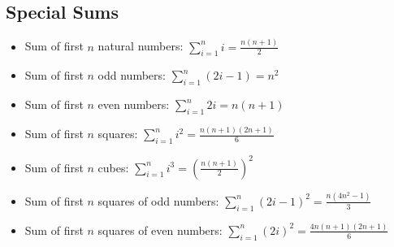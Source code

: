 \subsection{Special Sums}

\begin{itemize}
    \item Sum of first $n$ natural numbers: $\sum_{i=1}^{n} i = \frac{n(n+1)}{2}$
    \item Sum of first $n$ odd numbers: $\sum_{i=1}^{n} (2i-1) = n^2$
    \item Sum of first $n$ even numbers: $\sum_{i=1}^{n} 2i = n(n+1)$
    \item Sum of first $n$ squares: $\sum_{i=1}^{n} i^2 = \frac{n(n+1)(2n+1)}{6}$
    \item Sum of first $n$ cubes: $\sum_{i=1}^{n} i^3 = \left( \frac{n(n+1)}{2} \right)^2$
    \item Sum of first $n$ squares of odd numbers: $\sum_{i=1}^{n} (2i-1)^2 = \frac{n(4n^2 - 1)}{3}$
    \item Sum of first $n$ squares of even numbers: $\sum_{i=1}^{n} (2i)^2 = \frac{4n(n+1)(2n+1)}{6}$
\end{itemize}
